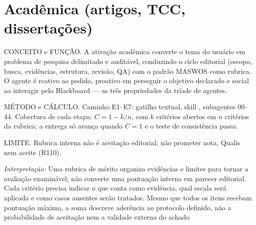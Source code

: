 \section{Acadêmica (artigos, TCC, dissertações)}
\begin{descricao}
CONCEITO e FUNÇÃO. A ativação acadêmica converte o tema do usuário em problema
de pesquisa delimitado e auditável, conduzindo o ciclo editorial (escopo, busca,
evidências, estrutura, revisão, QA) com o padrão MASWOS como rubrica. O agente é
reativo ao pedido, proativo em perseguir o objetivo declarado e social ao
interagir pelo Blackboard — as três propriedades da tríade de agentes.
\end{descricao}
\begin{metodo}
MÉTODO e CÁLCULO. Caminho E1--E7: gatilho textual, skill
, subagentes 00--44. Cobertura de cada etapa:
$C = 1 - k/n$, com $k$ critérios abertos em $n$ critérios da rubrica; a
entrega só avança quando $C = 1$ e o teste de consistência passa.
\end{metodo}
\begin{aviso}
LIMITE. Rubrica interna não é aceitação editorial; não prometer nota, Qualis
nem aceite (R110).
\end{aviso}
\noindent\textit{Interpretação:} Uma rubrica de mérito organiza evidências e limites para tornar a avaliação examinável; não converte uma pontuação interna em parecer editorial. Cada critério precisa indicar o que conta como evidência, qual escala será aplicada e como casos ausentes serão tratados. Mesmo que todos os itens recebam pontuação máxima, a soma descreve aderência ao protocolo definido, não a probabilidade de aceitação nem a validade externa do achado  %
